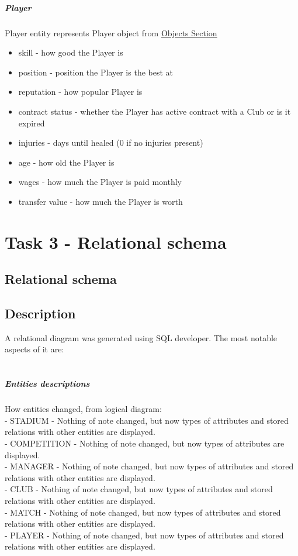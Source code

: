 \documentclass{report}
\begin{document}
\paragraph{Player}
Player entity represents Player object from \hyperref[Objects Section]{Objects Section}
\begin{itemize}
    \item skill - how good the Player is
    \item position - position the Player is the best at
    \item reputation - how popular Player is
    \item contract status - whether the Player has active contract with a Club or is it expired
    \item injuries - days until healed (0 if no injuries present)
    \item age - how old the Player is
    \item wages - how much the Player is paid monthly
    \item transfer value - how much the Player is worth
\end{itemize}

\chapter{Task 3 - Relational schema}
\section{Relational schema}

\section{Description}
A relational diagram was generated using SQL developer. The most notable aspects of it are:\\
\\
\paragraph{Entities descriptions}
How entities changed, from logical diagram:\\
- STADIUM - Nothing of note changed, but now types of attributes and stored relations with other entities are displayed.\\
- COMPETITION - Nothing of note changed, but now types of attributes are displayed.\\
- MANAGER - Nothing of note changed, but now types of attributes and stored relations with other entities are displayed.\\
- CLUB - Nothing of note changed, but now types of attributes and stored relations with other entities are displayed.\\
- MATCH - Nothing of note changed, but now types of attributes and stored relations with other entities are displayed.\\
- PLAYER - Nothing of note changed, but now types of attributes and stored relations with other entities are displayed.\\
\end{document}
